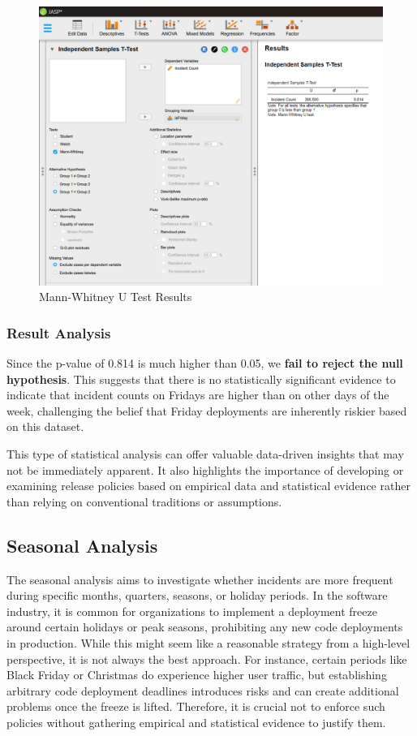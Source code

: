 \documentclass{article}
\begin{document}
\begin{figure}[H]
    \centering
    \includegraphics[width=0.7\linewidth]{resources/Screenshot 2024-09-28 011601.png}
    \caption{Mann-Whitney U Test Results}
    \label{fig:enter-label}
\end{figure}

\subsubsection{Result Analysis}

Since the p-value of 0.814 is much higher than 0.05, we \textbf{fail to reject the null hypothesis}. This suggests that there is no statistically significant evidence to indicate that incident counts on Fridays are higher than on other days of the week, challenging the belief that Friday deployments are inherently riskier based on this dataset. 

This type of statistical analysis can offer valuable data-driven insights that may not be immediately apparent. It also highlights the importance of developing or examining release policies based on empirical data and statistical evidence rather than relying on conventional traditions or assumptions.

\subsection{Seasonal Analysis}

The seasonal analysis aims to investigate whether incidents are more frequent during specific months, quarters, seasons, or holiday periods. In the software industry, it is common for organizations to implement a deployment freeze around certain holidays or peak seasons, prohibiting any new code deployments in production. While this might seem like a reasonable strategy from a high-level perspective, it is not always the best approach. For instance, certain periods like Black Friday or Christmas do experience higher user traffic, but establishing arbitrary code deployment deadlines introduces risks and can create additional problems once the freeze is lifted. Therefore, it is crucial not to enforce such policies without gathering empirical and statistical evidence to justify them.
\end{document}
